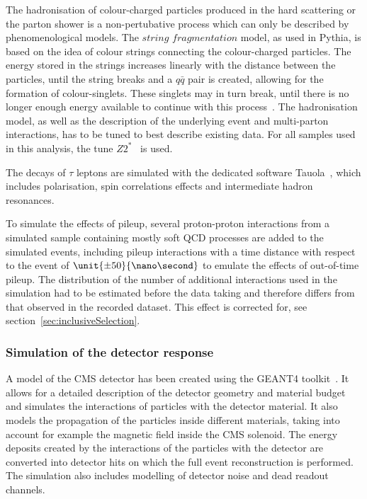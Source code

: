 The hadronisation of colour-charged particles produced in the hard scattering or the parton shower is a non-pertubative process which can only be described by phenomenological models. The $\textit{string fragmentation}$ model, as used in Pythia, is based on the idea of colour strings connecting the colour-charged particles. The energy stored in the strings increases linearly with the distance between the  particles, until the string breaks and a $q\bar{q}$ pair is created, allowing for the formation of colour-singlets. These singlets may in turn break, until there is no longer enough energy available to continue with this process~\cite{Pythia}. The hadronisation model, as well as the description of the underlying event and multi-parton interactions, has to be tuned to best describe existing data. For all samples used in this analysis, the tune $Z2^{*}$~\cite{Field:2011iq} is used. 

The decays of $\tau$ leptons are simulated with the dedicated software Tauola~\cite{Jadach1993361}, which includes polarisation, spin correlations effects and intermediate hadron resonances. 

To simulate the effects of pileup, several proton-proton interactions from a simulated sample containing mostly soft QCD processes are added to the simulated events, including pileup interactions with a time distance with respect to the event of $\unit{\pm50}{\nano\second}$ to emulate the effects of out-of-time pileup. The distribution of the number of additional interactions used in the simulation had to be estimated before the data taking and therefore differs from that observed in the recorded dataset. This effect is corrected for, see section~\ref{sec:inclusiveSelection}.

\subsubsection{Simulation of the detector response}
A model of the CMS detector has been created using the GEANT4 toolkit~\cite{Agostinelli:2002hh}. It allows for a detailed description of the detector geometry and material budget and simulates the interactions of particles with the detector material. It also models the propagation of the particles inside different materials, taking into account for example the magnetic field inside the CMS solenoid. The energy deposits created by the interactions of the particles with the detector are converted into detector hits on which the full event reconstruction is performed. The simulation also includes modelling of detector noise and dead readout channels.  

